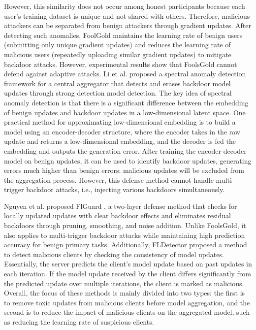 \documentclass[conference]{IEEEtran}
\begin{document}
However, this similarity does not occur among honest participants because each user's training dataset is unique and not shared with others.
Therefore, malicious attackers can be separated from benign attackers through gradient updates. After detecting such anomalies,
FoolGold maintains the learning rate of benign users (submitting only unique gradient updates) and reduces the learning rate of malicious users
(repeatedly uploading similar gradient updates) to mitigate backdoor attacks. However, experimental results show that
FoolsGold cannot defend against adaptive attacks. Li et al. \cite{b79} proposed a spectral anomaly detection framework for a
central aggregator that detects and erases backdoor model updates through strong detection model detection.
The key idea of spectral anomaly detection is that there is a significant difference between the embedding
of benign updates and backdoor updates in a low-dimensional latent space. One practical method for approximating
low-dimensional embedding is to build a model using an encoder-decoder structure, where the encoder takes
in the raw update and returns a low-dimensional embedding, and the decoder is fed the embedding and outputs
the generation error. After training the encoder-decoder model on benign updates, it can be used to identify
backdoor updates, generating errors much higher than benign errors; malicious updates will be excluded from
the aggregation process. However, this defense method cannot handle multi-trigger backdoor attacks, i.e.,
injecting various backdoors simultaneously.

Nguyen et al. proposed FlGuard \cite{b80}, a two-layer defense method that checks
for locally updated updates with clear backdoor effects and eliminates residual backdoors through pruning, smoothing, and noise
addition. Unlike FoolsGold\cite{b78}, it also applies to multi-trigger backdoor attacks while maintaining high prediction accuracy for benign primary tasks.
Additionally, FLDetector \cite{b81} proposed a method to detect malicious clients by checking the consistency of model updates. Essentially,
the server predicts the client's model update based on past updates in each iteration. If the model update received by the client
differs significantly from the predicted update over multiple iterations, the client is marked as malicious. Overall, the focus of
these methods is mainly divided into two types: the first is to remove toxic updates from malicious clients before model aggregation,
and the second is to reduce the impact of malicious clients on the aggregated model, such as reducing the learning rate of suspicious clients.
\end{document}
